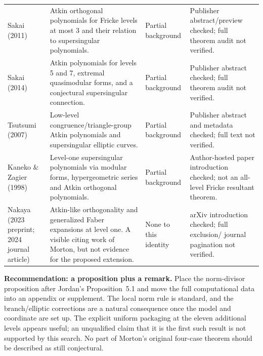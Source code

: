 \documentclass[11pt,a4paper]{article}
\begin{document}
\begin{longtable}{L{.19\linewidth}L{.45\linewidth}L{.10\linewidth}L{.16\linewidth}}
Sakai (2011) & Atkin orthogonal polynomials for Fricke levels at most 3 and their relation to supersingular polynomials. & Partial background & Publisher abstract/preview checked; full theorem audit not verified.\\\addlinespace
Sakai (2014) & Atkin polynomials for levels 5 and 7, extremal quasimodular forms, and a conjectural supersingular connection. & Partial background & Publisher abstract checked; full theorem audit not verified.\\\addlinespace
Tsutsumi (2007) & Low-level congruence/triangle-group Atkin polynomials and supersingular elliptic curves. & Partial background & Publisher abstract and metadata checked; full text not verified.\\\addlinespace
Kaneko \& Zagier (1998) & Level-one supersingular polynomials via modular forms, hypergeometric series and Atkin orthogonal polynomials. & Partial background & Author-hosted paper introduction checked; not an all-level Fricke resultant theorem.\\\addlinespace
Nakaya (2023 preprint; 2024 journal article) & Atkin-like orthogonality and generalized Faber expansions at level one. A visible citing work of Morton, but not evidence for the proposed extension. & None to this identity & arXiv introduction checked; full exclusion/ journal pagination not verified.\\
\bottomrule
\end{longtable}

\textbf{Recommendation: a proposition plus a remark.} Place the norm-divisor proposition after Jordan's Proposition~5.1 and move the full computational data into an appendix or supplement. The local norm rule is standard, and the branch/elliptic corrections are a natural consequence once the model and coordinate are set up. The explicit uniform packaging at the eleven additional levels appears useful; an unqualified claim that it is the first such result is not supported by this search. No part of Morton's original four-case theorem should be described as still conjectural.
\end{document}
